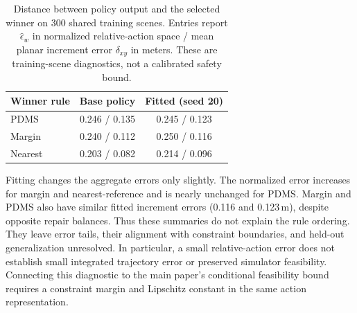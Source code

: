 \documentclass[10pt,letterpaper]{article}
\begin{document}
\begin{table}[H]
\centering
\caption{Distance between policy output and the selected winner on 300 shared training scenes. Entries report $\hat\epsilon_w$ in normalized relative-action space / mean planar increment error $\delta_{xy}$ in meters. These are training-scene diagnostics, not a calibrated safety bound.}
\label{tab:epsw}
\begin{tabular}{lcc}
\toprule
Winner rule & Base policy & Fitted (seed 20) \\
\midrule
PDMS & 0.246 / 0.135 & 0.245 / 0.123 \\
Margin & 0.240 / 0.112 & 0.250 / 0.116 \\
Nearest & 0.203 / 0.082 & 0.214 / 0.096 \\
\bottomrule
\end{tabular}
\end{table}

Fitting changes the aggregate errors only slightly. The normalized error increases for margin and nearest-reference and is nearly unchanged for PDMS. Margin and PDMS also have similar fitted increment errors (0.116 and 0.123\,m), despite opposite repair balances. Thus these summaries do not explain the rule ordering. They leave error tails, their alignment with constraint boundaries, and held-out generalization unresolved. In particular, a small relative-action error does not establish small integrated trajectory error or preserved simulator feasibility. Connecting this diagnostic to the main paper's conditional feasibility bound requires a constraint margin and Lipschitz constant in the same action representation.


\FloatBarrier
\end{document}
